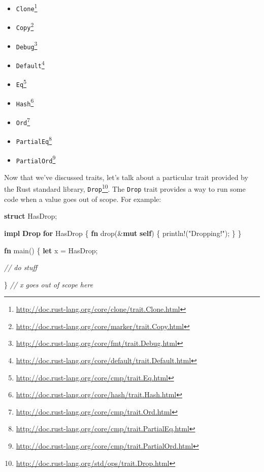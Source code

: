 \documentclass[a4paper,]{book}
\newenvironment{Shaded}{\begin{snugshade}}{\end{snugshade}}
\newcommand{\KeywordTok}[1]{\textcolor[rgb]{0.13,0.29,0.53}{\textbf{{#1}}}}
\newcommand{\StringTok}[1]{\textcolor[rgb]{0.31,0.60,0.02}{{#1}}}
\newcommand{\CommentTok}[1]{\textcolor[rgb]{0.56,0.35,0.01}{\textit{{#1}}}}
\newcommand{\OtherTok}[1]{\textcolor[rgb]{0.56,0.35,0.01}{{#1}}}
\newcommand{\NormalTok}[1]{{#1}}
\renewcommand{\href}[2]{#2\footnote{\url{#1}}}
\begin{document}
\begin{itemize}
\itemsep1pt\parskip0pt
\item
  \href{http://doc.rust-lang.org/core/clone/trait.Clone.html}{\texttt{Clone}}
\item
  \href{http://doc.rust-lang.org/core/marker/trait.Copy.html}{\texttt{Copy}}
\item
  \href{http://doc.rust-lang.org/core/fmt/trait.Debug.html}{\texttt{Debug}}
\item
  \href{http://doc.rust-lang.org/core/default/trait.Default.html}{\texttt{Default}}
\item
  \href{http://doc.rust-lang.org/core/cmp/trait.Eq.html}{\texttt{Eq}}
\item
  \href{http://doc.rust-lang.org/core/hash/trait.Hash.html}{\texttt{Hash}}
\item
  \href{http://doc.rust-lang.org/core/cmp/trait.Ord.html}{\texttt{Ord}}
\item
  \href{http://doc.rust-lang.org/core/cmp/trait.PartialEq.html}{\texttt{PartialEq}}
\item
  \href{http://doc.rust-lang.org/core/cmp/trait.PartialOrd.html}{\texttt{PartialOrd}}
\end{itemize}


Now that we've discussed traits, let's talk about a particular trait
provided by the Rust standard library,
\href{http://doc.rust-lang.org/std/ops/trait.Drop.html}{\texttt{Drop}}.
The \texttt{Drop} trait provides a way to run some code when a value
goes out of scope. For example:

\begin{Shaded}
\begin{Highlighting}[]
\KeywordTok{struct} \NormalTok{HasDrop;}

\KeywordTok{impl} \KeywordTok{Drop} \KeywordTok{for} \NormalTok{HasDrop \{}
    \KeywordTok{fn} \NormalTok{drop(&}\KeywordTok{mut} \KeywordTok{self}\NormalTok{) \{}
        \OtherTok{println!}\NormalTok{(}\StringTok{"Dropping!"}\NormalTok{);}
    \NormalTok{\}}
\NormalTok{\}}

\KeywordTok{fn} \NormalTok{main() \{}
    \KeywordTok{let} \NormalTok{x = HasDrop;}

    \CommentTok{// do stuff}

\NormalTok{\} }\CommentTok{// x goes out of scope here}
\end{Highlighting}
\end{Shaded}
\end{document}
